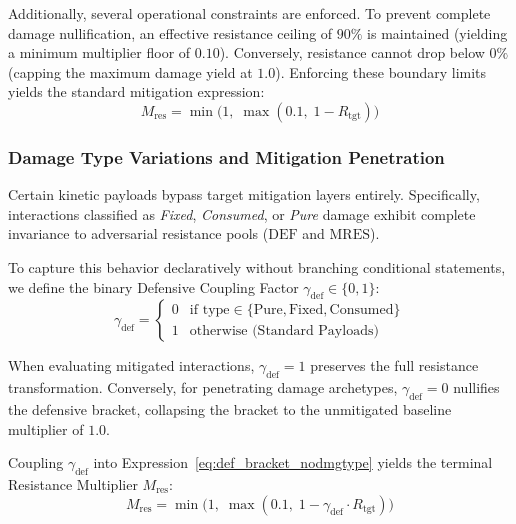 \documentclass[twocolumn,10pt]{article}
\begin{document}
Additionally, several operational constraints are enforced. To prevent complete damage nullification, an effective resistance ceiling of $90\%$ is maintained (yielding a minimum multiplier floor of $0.10$). Conversely, resistance cannot drop below $0\%$ (capping the maximum damage yield at $1.0$). Enforcing these boundary limits yields the standard mitigation expression:
\begin{equation}
\label{eq:def_bracket_nodmgtype}
  M_{\text{res}} = \min \Big( 1, \; \max \left( 0.1, \; 1 - R_{\text{tgt}} \right) \Big)
\end{equation}

\subsubsection{Damage Type Variations and Mitigation Penetration}
\label{sec:damage_type_introduction}
Certain kinetic payloads bypass target mitigation layers entirely. Specifically, interactions classified as \textit{Fixed}, \textit{Consumed}, or \textit{Pure} damage exhibit complete invariance to adversarial resistance pools ($\text{DEF}$ and $\text{MRES}$).

To capture this behavior declaratively without branching conditional statements, we define the binary Defensive Coupling Factor $\gamma_{\text{def}} \in \{0, 1\}$:
\begin{equation}
  \label{eq:gamma_def}
  \gamma_{\text{def}} = 
  \begin{cases} 
    0 & \text{if } \text{type} \in \{\text{Pure}, \text{Fixed}, \text{Consumed}\} \\ 
    1 & \text{otherwise (Standard Payloads)} 
  \end{cases}
\end{equation}

When evaluating mitigated interactions, $\gamma_{\text{def}} = 1$ preserves the full resistance transformation. Conversely, for penetrating damage archetypes, $\gamma_{\text{def}} = 0$ nullifies the defensive bracket, collapsing the bracket to the unmitigated baseline multiplier of $1.0$.

Coupling $\gamma_{\text{def}}$ into Expression~\ref{eq:def_bracket_nodmgtype} yields the terminal Resistance Multiplier $M_{\text{res}}$:
\begin{equation}
\label{eq:def_bracket_dmgtype}
  M_{\text{res}} = \min \Big( 1, \; \max \left( 0.1, \; 1 - \gamma_{\text{def}} \cdot R_{\text{tgt}} \right) \Big)
\end{equation}
\end{document}
